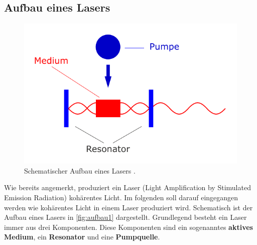 \subsection{Aufbau eines Lasers}
\label{sec:aufbau1} 
\begin{figure}
    \centering
    \includegraphics[width = 0.7 \linewidth]{pictures/aufbau1.pdf}
    \caption{Schematischer Aufbau eines Lasers \cite{leifilaser}.}
    \label{fig:aufbau1}
\end{figure}
Wie bereits angemerkt, produziert ein Laser (Light Amplification by Stimulated Emission Radiation) kohärentes Licht.
Im folgenden soll darauf eingegangen werden wie kohärentes Licht in einem Laser produziert wird.
Schematisch ist der Aufbau eines Lasers in \autoref{fig:aufbau1} dargestellt.
Grundlegend besteht ein Laser immer aus drei Komponenten.
Diese Komponenten sind ein sogenanntes \textbf{aktives Medium}, ein \textbf{Resonator} und eine \textbf{Pumpquelle}.

